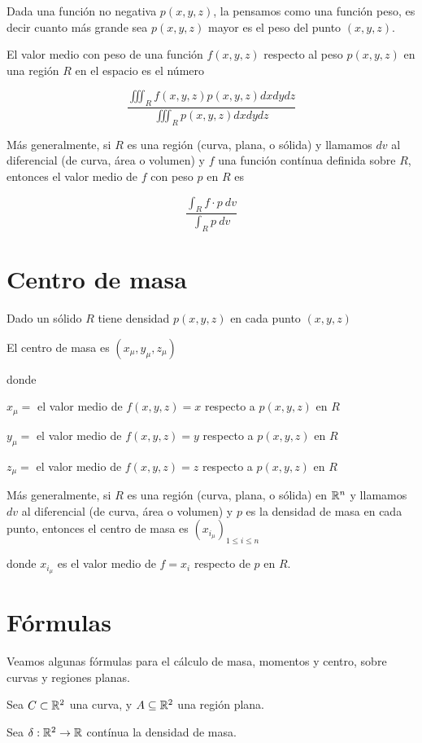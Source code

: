 Dada una función no negativa $p(x,y,z)$, la pensamos como una función peso, es decir cuanto más grande sea $p(x,y,z)$ mayor es el peso del punto $(x,y,z)$.

El valor medio con peso de una función $f(x,y,z)$ respecto al peso $p(x,y,z)$ en una región $R$ en el espacio es el número

$$\frac{ \iiint_R f(x,y,z) p(x,y,z) dxdydz}{ \iiint_R p(x,y,z) dxdydz} $$

Más generalmente, si $R$ es una región (curva, plana, o sólida) y llamamos $dv$ al diferencial (de curva, área o volumen) y $f$ una función contínua definida sobre $R$, entonces el valor medio de $f$ con peso $p$ en $R$ es

$$\frac{ \int_R f \cdot p \ dv}{ \int_R p \ dv} $$

\section{Centro de masa}

Dado un sólido $R$ tiene densidad $p(x,y,z)$ en cada punto $(x,y,z)$

El centro de masa es $(x_\mu, y_\mu, z_\mu)$

donde

$x_\mu =$ el valor medio de $f(x,y,z) = x$ respecto a $p(x,y,z)$ en $R$

$y_\mu =$ el valor medio de $f(x,y,z) = y$ respecto a $p(x,y,z)$ en $R$

$z_\mu =$ el valor medio de $f(x,y,z) = z$ respecto a $p(x,y,z)$ en $R$

Más generalmente, si $R$ es una región (curva, plana, o sólida) en $\mathbb{R}^n$ y llamamos $dv$ al diferencial (de curva, área o volumen) y $p$ es la densidad de masa en cada punto, entonces el centro de masa es $(x_{i_\mu})_{1 \leq i \leq n} $

donde $x_{i_\mu}$ es el valor medio de $f=x_i$ respecto de $p$ en $R$.

\section{Fórmulas}

Veamos algunas fórmulas para el cálculo de masa, momentos y centro, sobre curvas y regiones planas.

Sea $ C \subset \mathbb{R}^2$ una curva, y $A \subseteq \mathbb{R}^2$ una región plana.

Sea $ \delta: \mathbb{R}^2 \to \mathbb{R}$ contínua la densidad de masa.

